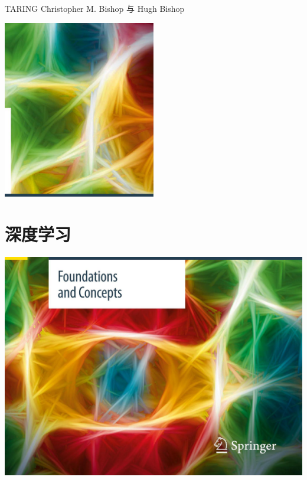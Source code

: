 \documentclass[10pt]{report}
\begin{document}
TARING Christopher M. Bishop 与 Hugh Bishop




\begin{center}
\includegraphics[max width=0.5\textwidth]{images/0194e279-9b28-703a-88f4-c3ac21e2010d_0_968_0_675_789_0.jpg}
\end{center}
\hspace*{3em} 

\section*{深度学习}

\begin{center}
\includegraphics[max width=1.0\textwidth]{images/0194e279-9b28-703a-88f4-c3ac21e2010d_0_0_1124_1643_1207_0.jpg}
\end{center}
\hspace*{3em} 
\end{document}
